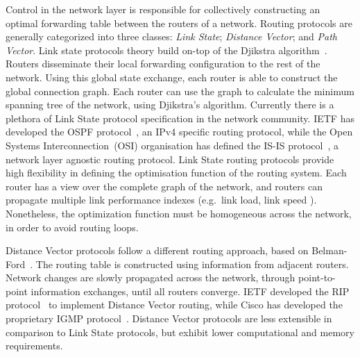 Control in the network layer is responsible for collectively constructing an optimal
forwarding table between the routers of a network.  Routing protocols are generally
categorized into three classes: \emph{Link State}; \emph{Distance Vector}; and
\emph{Path Vector}. Link state protocols theory build on-top of the Djikstra
algorithm~. Routers disseminate their local forwarding
configuration to the rest of the network.  Using this global state exchange,
each router is able to construct the global connection graph. Each router can
use the graph to calculate the minimum spanning tree of the network, using
Djikstra's algorithm.  Currently there is a plethora of Link State protocol
specification in the network community.  IETF has developed the OSPF
protocol~, an IPv4 specific routing protocol, while the Open
Systems Interconnection~(OSI) organisation has defined the IS-IS
protocol~, a network layer agnostic routing protocol.  Link
State routing protocols provide high flexibility in defining the optimisation
function of the routing system.  Each router has a view over the complete graph of
the network, and routers can propagate multiple link performance indexes
(e.g.~link load, link speed ).  Nonetheless, the optimization function must be
homogeneous across the network, in order to avoid routing loops.

Distance Vector protocols follow a different routing approach, based on
Belman-Ford~. The routing table is constructed using
information from adjacent routers. Network changes are slowly propagated across
the network, through point-to-point information exchanges, until all routers
converge.  IETF developed the RIP  protocol~ to implement Distance
Vector routing, while Cisco has developed the proprietary IGMP
protocol~. Distance Vector protocols are less extensible in
comparison to Link State protocols, but exhibit lower computational and memory
requirements.

